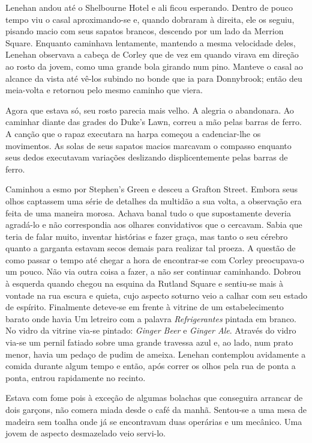Lenehan andou até o Shelbourne Hotel e ali ficou esperando. Dentro de
pouco tempo viu o casal aproximando-se e, quando dobraram à direita,
ele os seguiu, pisando macio com seus sapatos brancos, descendo por um
lado da Merrion Square. Enquanto caminhava lentamente, mantendo a
mesma velocidade deles, Lenehan observava a cabeça de Corley que de
vez em quando virava em direção ao rosto da jovem, como uma grande
bola girando num pino. Manteve o casal ao alcance da vista até vê-los
subindo no bonde que ia para Donnybrook; então deu meia-volta e
retornou pelo mesmo caminho que viera.

Agora que estava só, seu rosto parecia mais velho. A alegria o
abandonara. Ao caminhar diante das grades do Duke's Lawn, correu a mão
pelas barras de ferro. A canção que o rapaz executara na harpa começou
a cadenciar-lhe os movimentos. As solas de seus sapatos macios
marcavam o compasso enquanto seus dedos executavam variações
deslizando displicentemente pelas barras de ferro.

Caminhou a esmo por Stephen's Green e desceu a Grafton Street. Embora
seus olhos captassem uma série de detalhes da multidão a sua volta, a
observação era feita de uma maneira morosa. Achava banal tudo o que
supostamente deveria agradá-lo e não correspondia aos olhares
convidativos que o cercavam. Sabia que teria de falar muito, inventar
histórias e fazer graça, mas tanto o seu cérebro quanto a garganta
estavam secos demais para realizar tal proeza. A questão de como
passar o tempo até chegar a hora de encontrar-se com Corley
preocupava-o um pouco. Não via outra coisa a fazer, a não ser
continuar caminhando. Dobrou à esquerda quando chegou na esquina da
Rutland Square e sentiu-se mais à vontade na rua escura e quieta,
cujo aspecto soturno veio a calhar com seu estado de espírito.
Finalmente deteve-se em frente à vitrine de um estabelecimento barato
onde havia Um letreiro com a palavra \textit{Refrigerantes} pintada em branco.
No vidro da vitrine via-se pintado: \textit{Ginger Beer} e \textit{Ginger Ale}. Através
do vidro via-se um pernil fatiado sobre uma grande travessa azul e, ao
lado, num prato menor, havia um pedaço de pudim de ameixa. Lenehan
contemplou avidamente a comida durante algum tempo e então, após
correr os olhos pela rua de ponta a ponta, entrou rapidamente no
recinto.

Estava com fome pois à exceção de algumas bolachas que conseguira
arrancar de dois garçons, não comera miada desde o café da manhã.
Sentou-se a uma mesa de madeira sem toalha onde já se encontravam duas
operárias e um mecânico. Uma jovem de aspecto desmazelado veio
servi-lo.

